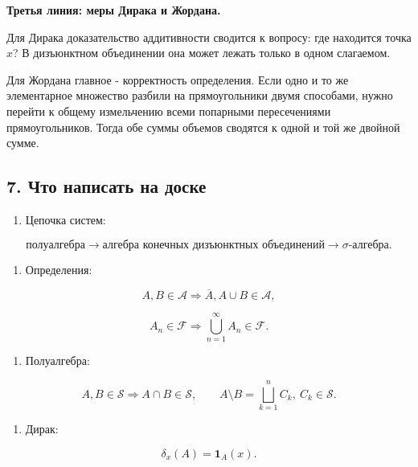 \documentclass[
  11pt,
  a4paper,
]{article}
\providecommand{\tightlist}{%
  \setlength{\itemsep}{0pt}\setlength{\parskip}{0pt}}
\begin{document}
\textbf{Третья линия: меры Дирака и Жордана.}

Для Дирака доказательство аддитивности сводится к вопросу: где находится
точка \(x\)? В дизъюнктном объединении она может лежать только в одном
слагаемом.

Для Жордана главное - корректность определения. Если одно и то же
элементарное множество разбили на прямоугольники двумя способами, нужно
перейти к общему измельчению всеми попарными пересечениями
прямоугольников. Тогда обе суммы объемов сводятся к одной и той же
двойной сумме.

\subsection{7. Что написать на
доске}\label{ux447ux442ux43e-ux43dux430ux43fux438ux441ux430ux442ux44c-ux43dux430-ux434ux43eux441ux43aux435}

\begin{enumerate}
\def\labelenumi{\arabic{enumi}.}
\tightlist
\item
  Цепочка систем:
\end{enumerate}

\[
\text{полуалгебра}\longrightarrow \text{алгебра конечных дизъюнктных объединений}\longrightarrow \sigma\text{-алгебра}.
\]

\begin{enumerate}
\def\labelenumi{\arabic{enumi}.}
\setcounter{enumi}{1}
\tightlist
\item
  Определения:
\end{enumerate}

\[
A,B\in\mathcal A\Rightarrow \overline{A},A\cup B\in\mathcal A,
\]

\[
A_n\in\mathcal F\Rightarrow \bigcup_{n=1}^{\infty}A_n\in\mathcal F.
\]

\begin{enumerate}
\def\labelenumi{\arabic{enumi}.}
\setcounter{enumi}{2}
\tightlist
\item
  Полуалгебра:
\end{enumerate}

\[
A,B\in\mathcal S\Rightarrow A\cap B\in\mathcal S,\qquad
A\setminus B=\bigsqcup_{k=1}^n C_k,\ C_k\in\mathcal S.
\]

\begin{enumerate}
\def\labelenumi{\arabic{enumi}.}
\setcounter{enumi}{3}
\tightlist
\item
  Дирак:
\end{enumerate}

\[
\delta_x(A)=\mathbf 1_A(x).
\]
\end{document}
